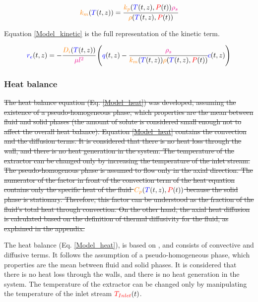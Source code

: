 \documentclass[../Parameter_fitting.tex]{subfiles}
\begin{document}
			{\footnotesize
				\begin{align}
					{\color{orange}k_m}({\color{blue}T}(t,z)) = \cfrac{{\color{orange}k_p}({\color{blue}T}(t,z),{\color{red}P}(t)) {\color{magenta}\rho_s}}{{\color{orange}\rho}({\color{blue}T}(t,z),{\color{red}P}(t))}
			\end{align} }
			
			Equation \ref{Model_kinetic} is the full representation of the kinetic term.
			
			{\footnotesize
				\begin{align}
					\label{Model_kinetic}
					{\color{blue}r_e}(t,z) = -\cfrac{{\color{orange}D_i}({\color{blue}T}(t,z))}{{\color{magenta} \mu l^2} }\left({\color{blue}q}(t,z) - \cfrac{{\color{magenta}\rho_s}}{{\color{orange}k_m}({\color{blue}T}(t,z)){\color{orange}\rho}({\color{blue}T}(t,z),{\color{red}P}(t))}  {\color{blue}c}(t,z) \right)
			\end{align} }
			
			\subsubsection{Heat balance} \label{CH: heat_balance}
			\sout{The heat balance equation (Eq.  \ref{Model_heat}) was developed, assuming the existence of a pseudo-homogeneous phase, which properties are the mean between fluid and solid phases (the amount of solute is considered small enough not to affect the overall heat balance). Equation \ref{Model_heat} contains the convection and the diffusion terms. It is considered that there is no heat loss through the wall, and there is no heat generation in the system. The temperature of the extractor can be changed only by increasing the temperature of the inlet stream. The pseudo-homogenous phase is assumed to flow only in the axial direction. 
				The numerator of the factor in front of the convection term of the heat equation contains only the specific heat of the fluid ${\color{orange}C_p}({\color{blue}T}(t,z),{\color{red}P}(t))$ because the solid phase is stationary. Therefore, this factor can be understood as the fraction of the fluid's total heat through convection. On the other hand, the axial heat diffusion is calculated based on the definition of thermal diffusivity for the fluid, as explained in the appendix. }
			
			{\color{blue} The heat balance (Eq. \ref{Model_heat}), is based on \citet{Srinivasan2012}, and consists of convective and diffusive terms. It follows the assumption of a pseudo-homogeneous phase, which properties are the mean between fluid and solid phases. It is considered that there is no heat loss through the walls, and there is no heat generation in the system. The temperature of the extractor can be changed only by manipulating the temperature of the inlet stream ${\color{red}T_{Inlet}}(t)$.
			}
			
\end{document}
